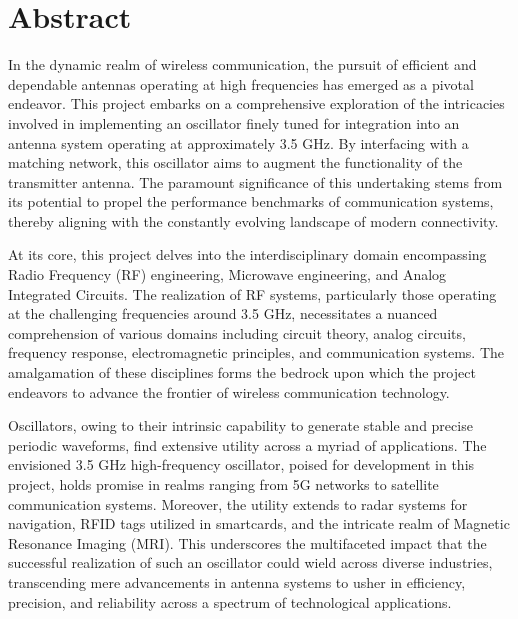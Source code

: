\section*{Abstract}

In the dynamic realm of wireless communication, the pursuit of efficient and dependable antennas operating at high frequencies has emerged as a pivotal endeavor. This project embarks on a comprehensive exploration of the intricacies involved in implementing an oscillator finely tuned for integration into an antenna system operating at approximately 3.5 GHz. By interfacing with a matching network, this oscillator aims to augment the functionality of the transmitter antenna. The paramount significance of this undertaking stems from its potential to propel the performance benchmarks of communication systems, thereby aligning with the constantly evolving landscape of modern connectivity.\par

At its core, this project delves into the interdisciplinary domain encompassing Radio Frequency (RF) engineering, Microwave engineering, and Analog Integrated Circuits. The realization of RF systems, particularly those operating at the challenging frequencies around 3.5 GHz, necessitates a nuanced comprehension of various domains including circuit theory, analog circuits, frequency response, electromagnetic principles, and communication systems. The amalgamation of these disciplines forms the bedrock upon which the project endeavors to advance the frontier of wireless communication technology.\par

Oscillators, owing to their intrinsic capability to generate stable and precise periodic waveforms, find extensive utility across a myriad of applications. The envisioned 3.5 GHz high-frequency oscillator, poised for development in this project, holds promise in realms ranging from 5G networks to satellite communication systems. Moreover, the utility extends to radar systems for navigation, RFID tags utilized in smartcards, and the intricate realm of Magnetic Resonance Imaging (MRI). This underscores the multifaceted impact that the successful realization of such an oscillator could wield across diverse industries, transcending mere advancements in antenna systems to usher in efficiency, precision, and reliability across a spectrum of technological applications.\par

